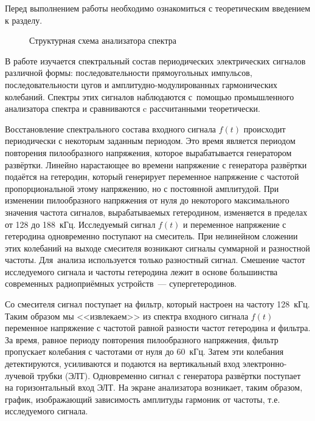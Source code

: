 

Перед выполнением работы необходимо ознакомиться с теоретическим введением
к разделу.

\begin{figure}[h!]
\centering
{}
\caption{Структурная схема анализатора спектра}
\end{figure}

В работе изучается спектральный состав периодических электрических сигналов
различной формы: последовательности прямоугольных импульсов, последовательности
цугов и амплитудно-модулированных гармонических колебаний. Спектры этих сигналов
наблюдаются с~помощью промышленного анализатора спектра и сравниваются c
рассчитанными теоретически.

Восстановление спектрального состава входного сигнала $f(t)$ происходит
периодически с некоторым заданным периодом. Это время является периодом
повторения пилообразного напряжения, которое вырабатывается генератором
развёртки. Линейно нарастающее во времени напряжение с генератора развёртки
подаётся на гетеродин, который генерирует переменное напряжение с частотой
пропорциональной этому напряжению, но с постоянной амплитудой. При изменении
пилообразного напряжения от нуля до некоторого максимального значения частота
сигналов, вырабатываемых гетеродином, изменяется в пределах от 128 до 188~кГц.
Исследуемый сигнал $f(t)$ и переменное напряжение с гетеродина одновременно
поступают на смеситель. При нелинейном сложении этих колебаний на выходе
смесителя возникают сигналы суммарной и разностной частоты. Для~анализа
используется только разностный сигнал. Смешение частот исследуемого сигнала и
частоты гетеродина лежит в основе большинства современных радиоприёмных
устройств~--- супергетеродинов.

Со смесителя сигнал поступает на фильтр, который настроен на частоту 128~кГц.
Таким образом мы <<извлекаем>> из спектра входного  сигнала $f(t)$ переменное
напряжение с частотой равной разности частот гетеродина и фильтра. За время,
равное периоду повторения пилообразного напряжения, фильтр пропускает колебания
с частотами от нуля до 60~кГц. Затем эти колебания детектируются, усиливаются и
подаются на вертикальный вход электронно-лучевой трубки (ЭЛТ). Одновременно
сигнал с генератора развёртки поступает на горизонтальный вход ЭЛТ. На экране
анализатора возникает, таким образом, график, изображающий зависимость амплитуды
гармоник от частоты, т.е.  исследуемого сигнала.


